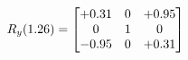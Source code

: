 \documentclass[preview]{standalone}
\begin{document}
\begin{align*}
\special{dvisvgm:raw <g id='unique000'>}R_{y}(1.26) = \begin{bmatrix}+0.31 & 0 & +0.95 \\0 & 1 & 0 \\-0.95 & 0 & +0.31\end{bmatrix}\special{dvisvgm:raw </g>}
\end{align*}
\end{document}
